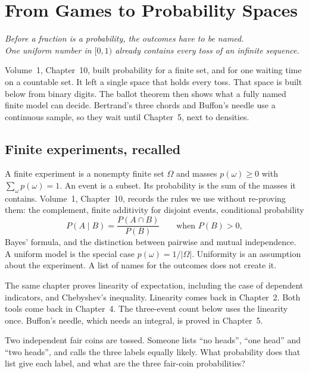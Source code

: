 \chapter{From Games to Probability Spaces}

\begin{center}\itshape
Before a fraction is a probability, the outcomes have to be named.\\
One uniform number in $[0,1)$ already contains every toss of an infinite sequence.
\end{center}

Volume~1, Chapter~10, built probability for a finite set, and for one waiting time on a countable set. It left a single space that holds every toss. That space is built below from binary digits. The ballot theorem then shows what a fully named finite model can decide. Bertrand's three chords and Buffon's needle use a continuous sample, so they wait until Chapter~5, next to densities.

\section{Finite experiments, recalled}

A finite experiment is a nonempty finite set $\Omega$ and masses $p(\omega)\ge0$ with $\sum_\omega p(\omega)=1$. An event is a subset. Its probability is the sum of the masses it contains. Volume~1, Chapter~10, records the rules we use without re-proving them: the complement, finite additivity for disjoint events, conditional probability
\[
 P(A\mid B)=\frac{P(A\cap B)}{P(B)}\qquad\text{when }P(B)>0,
\]
Bayes' formula, and the distinction between pairwise and mutual independence. A uniform model is the special case $p(\omega)=1/|\Omega|$. Uniformity is an assumption about the experiment. A list of names for the outcomes does not create it.

The same chapter proves linearity of expectation, including the case of dependent indicators, and Chebyshev's inequality. Linearity comes back in Chapter~2. Both tools come back in Chapter~4. The three-event count below uses the linearity once. Buffon's needle, which needs an integral, is proved in Chapter~5.

\begin{think}
Two independent fair coins are tossed. Someone lists ``no heads'', ``one head'' and ``two heads'', and calls the three labels equally likely. What probability does that list give each label, and what are the three fair-coin probabilities?
\end{think}

